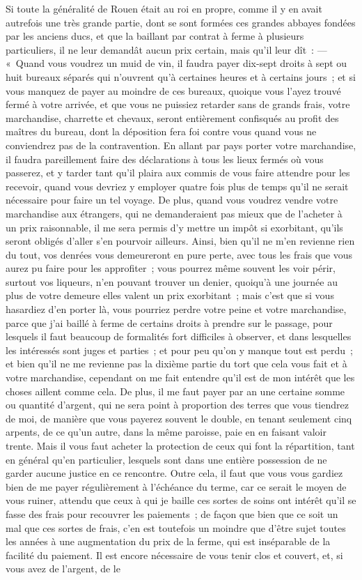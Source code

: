\documentclass[french,twoside]{book} %
\begin{document}
Si toute la généralité de Rouen était au roi en propre, comme il y en avait autrefois une très grande partie, dont se sont formées ces grandes abbayes fondées par les anciens ducs, et que la baillant par contrat à ferme à plusieurs particuliers, il ne leur demandât aucun prix certain, mais qu’il leur dît : — « Quand vous voudrez un muid de vin, il faudra payer dix-sept droits à sept ou huit bureaux séparés qui n’ouvrent qu’à certaines heures et à certains jours ; et si vous manquez de payer au moindre de ces bureaux, quoique vous l’ayez trouvé fermé à votre arrivée, et que vous ne puissiez retarder sans de grands frais, votre marchandise, charrette et chevaux, seront entièrement confisqués au profit des maîtres du bureau, dont la déposition fera foi contre vous quand vous ne conviendrez pas de la contravention. En allant par pays porter votre marchandise, il faudra pareillement faire des déclarations à tous les lieux fermés où vous passerez, et y tarder tant qu’il plaira aux commis de vous faire attendre pour les recevoir, quand vous devriez y employer quatre fois plus de temps qu’il ne serait nécessaire pour faire un tel voyage. De plus, quand vous voudrez vendre votre marchandise aux étrangers, qui ne demanderaient pas mieux que de l’acheter à un prix raisonnable, il me sera permis d’y mettre un impôt si exorbitant, qu’ils seront obligés d’aller s’en pourvoir ailleurs. Ainsi, bien qu’il ne m’en revienne rien du tout, vos denrées vous demeureront en pure perte, avec tous les frais que vous aurez pu faire pour les approfiter ; vous pourrez même souvent les voir périr, surtout vos liqueurs, n’en pouvant trouver un denier, quoiqu’à une journée au plus de votre demeure elles valent un prix exorbitant ; mais c’est que si vous hasardiez d’en porter là, vous pourriez perdre votre peine et votre marchandise, parce que j’ai baillé à ferme de certains droits à prendre sur le passage, pour lesquels il faut beaucoup de formalités fort difficiles à observer, et dans lesquelles les intéressés sont juges et parties ; et pour peu qu’on y manque tout est perdu ; et bien qu’il ne me revienne pas la dixième partie du tort que cela vous fait et à votre marchandise, cependant on me fait entendre qu’il est de mon intérêt que les choses aillent comme cela. De plus, il me faut payer par an une certaine somme ou quantité d’argent, qui ne sera point à proportion des terres que vous tiendrez de moi, de manière que vous payerez souvent le double, en tenant seulement cinq arpents, de ce qu’un autre, dans la même paroisse, paie en en faisant valoir trente. Mais il vous faut acheter la protection de ceux qui font la répartition, tant en général qu’en particulier, lesquels sont dans une entière possession de ne garder aucune justice en ce rencontre. Outre cela, il faut que vous vous gardiez bien de me payer régulièrement à l’échéance du terme, car ce serait le moyen de vous ruiner, attendu que ceux à qui je baille ces sortes de soins ont intérêt qu’il se fasse des frais pour recouvrer les paiements ; de façon que bien que ce soit un mal que ces sortes de frais, c’en est toutefois un moindre que d’être sujet toutes les années à une augmentation du prix de la ferme, qui est inséparable de la facilité du paiement. Il est encore nécessaire de vous tenir clos et couvert, et, si vous avez de l’argent, de le 
\end{document}
